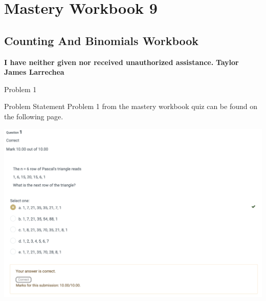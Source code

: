 \clearpage
\chapter{Mastery Workbook 9}

\section{Counting And Binomials Workbook}


\begin{center}
    \Large{\textbf{I have neither given nor received unauthorized assistance.}}
    \large{\textbf{Taylor James Larrechea}}
\end{center}

\begin{problem}{Problem 1}
    \begin{statement}{Problem Statement}
        Problem 1 from the mastery workbook quiz can be found on the following page.
    \end{statement}
    \begin{Highlight}[Solution]
        \begin{center}
            \includegraphics[width = 1.0\textwidth]{Images/Problem 1.png}
        \end{center}
    \end{Highlight}
\end{problem}

